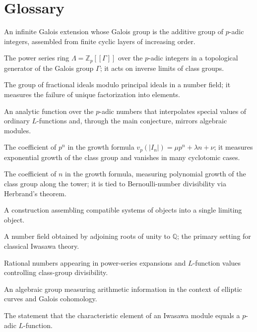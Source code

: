 \section*{Glossary}
\begin{description}[leftmargin=*,style=nextline,itemsep=0.3em]
\item[\textbf{$\mathbb{Z}_p$-extension.}] An infinite Galois extension whose Galois group is the additive group of $p$-adic integers, assembled from finite cyclic layers of increasing order.
\item[\textbf{Iwasawa algebra.}] The power series ring $\Lambda=\mathbb{Z}_p[[\Gamma]]$ over the $p$-adic integers in a topological generator of the Galois group $\Gamma$; it acts on inverse limits of class groups.
\item[\textbf{Class group.}] The group of fractional ideals modulo principal ideals in a number field; it measures the failure of unique factorization into elements.
\item[\textbf{$p$-adic $L$-function.}] An analytic function over the $p$-adic numbers that interpolates special values of ordinary $L$-functions and, through the main conjecture, mirrors algebraic modules.
\item[\textbf{$\mu$-invariant.}] The coefficient of $p^n$ in the growth formula $v_p(|I_n|)=\mu p^n+\lambda n+\nu$; it measures exponential growth of the class group and vanishes in many cyclotomic cases.
\item[\textbf{$\lambda$-invariant.}] The coefficient of $n$ in the growth formula, measuring polynomial growth of the class group along the tower; it is tied to Bernoulli-number divisibility via Herbrand's theorem.
\item[\textbf{Inverse limit.}] A construction assembling compatible systems of objects into a single limiting object.
\item[\textbf{Cyclotomic field.}] A number field obtained by adjoining roots of unity to $\mathbb{Q}$; the primary setting for classical Iwasawa theory.
\item[\textbf{Bernoulli number.}] Rational numbers appearing in power-series expansions and $L$-function values controlling class-group divisibility.
\item[\textbf{Selmer group.}] An algebraic group measuring arithmetic information in the context of elliptic curves and Galois cohomology.
\item[\textbf{Main conjecture.}] The statement that the characteristic element of an Iwasawa module equals a $p$-adic $L$-function.
\end{description}
